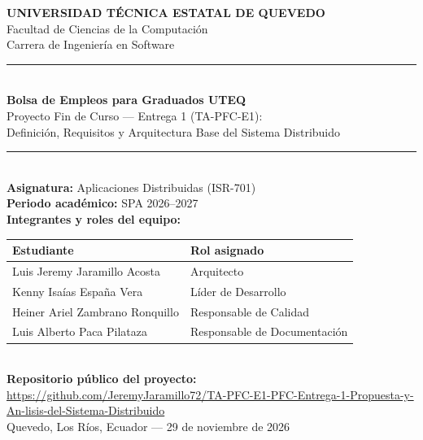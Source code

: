 \documentclass[11pt,a4paper]{article}
\begin{document}
\begin{titlepage}
    \centering
    \vspace*{1cm}
    {\Large \textbf{UNIVERSIDAD TÉCNICA ESTATAL DE QUEVEDO}}\\[0.2cm]
    {\large Facultad de Ciencias de la Computación}\\[0.2cm]
    {\large Carrera de Ingeniería en Software}\\[1.2cm]

    \rule{\linewidth}{0.5mm}\\[0.4cm]
    {\LARGE \textbf{Bolsa de Empleos para Graduados UTEQ}}\\[0.3cm]
    {\large Proyecto Fin de Curso — Entrega 1 (TA-PFC-E1):\\Definición, Requisitos y Arquitectura Base del Sistema Distribuido}\\[0.2cm]
    \rule{\linewidth}{0.5mm}\\[1.2cm]

    \textbf{Asignatura:} Aplicaciones Distribuidas (ISR-701)\\[0.2cm]
    \textbf{Periodo académico:} SPA 2026--2027\\[0.8cm]

    \textbf{Integrantes y roles del equipo:}\\[0.3cm]
    \begin{tabular}{l l}
        \toprule
        \textbf{Estudiante} & \textbf{Rol asignado} \\
        \midrule
        Luis Jeremy Jaramillo Acosta & Arquitecto \\
        Kenny Isaías España Vera & Líder de Desarrollo \\
        Heiner Ariel Zambrano Ronquillo & Responsable de Calidad \\
        Luis Alberto Paca Pilataza & Responsable de Documentación \\
        \bottomrule
    \end{tabular}\\[1cm]

    \textbf{Repositorio público del proyecto:}\\
    \url{https://github.com/JeremyJaramillo72/TA-PFC-E1-PFC-Entrega-1-Propuesta-y-An-lisis-del-Sistema-Distribuido}\\[1.2cm]

    \vfill
    {\large Quevedo, Los Ríos, Ecuador --- 29 de noviembre de 2026}
\end{titlepage}
\end{document}
